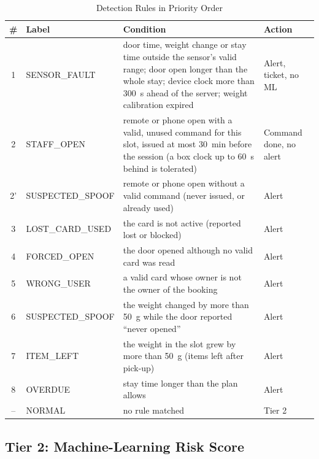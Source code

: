\begin{table}[t]
\renewcommand{\arraystretch}{1.1}
\centering
\small
\caption{Detection Rules in Priority Order}
\label{tab:rules}
\begin{tabular}{c l p{8.4cm} l}
\toprule
\# & Label & Condition & Action \\
\midrule
1 & SENSOR\_FAULT & door time, weight change or stay time outside the sensor's valid range; door open longer than the whole stay; device clock more than 300~s ahead of the server; weight calibration expired & Alert, ticket, no ML \\
2 & STAFF\_OPEN & remote or phone open with a valid, unused command for this slot, issued at most 30~min before the session (a box clock up to 60~s behind is tolerated) & Command done, no alert \\
2' & SUSPECTED\_SPOOF & remote or phone open without a valid command (never issued, or already used) & Alert \\
3 & LOST\_CARD\_USED & the card is not active (reported lost or blocked) & Alert \\
4 & FORCED\_OPEN & the door opened although no valid card was read & Alert \\
5 & WRONG\_USER & a valid card whose owner is not the owner of the booking & Alert \\
6 & SUSPECTED\_SPOOF & the weight changed by more than 50~g while the door reported ``never opened'' & Alert \\
7 & ITEM\_LEFT & the weight in the slot grew by more than 50~g (items left after pick-up) & Alert \\
8 & OVERDUE & stay time longer than the plan allows & Alert \\
-- & NORMAL & no rule matched & Tier 2 \\
\bottomrule
\end{tabular}
\end{table}

\subsection{Tier 2: Machine-Learning Risk Score}


